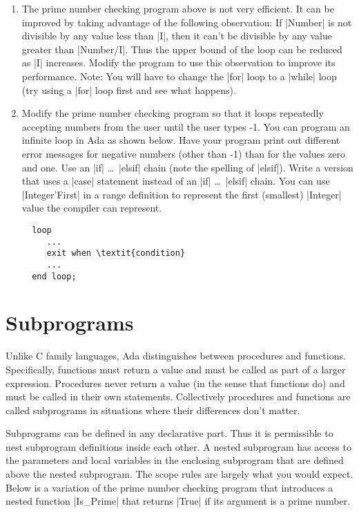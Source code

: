 \begin{enumerate}
\item The prime number checking program above is not very efficient. It can be improved by
  taking advantage of the following observation: If |Number| is not divisible by any value less
  than |I|, then it can't be divisible by any value greater than |Number/I|. Thus the upper
  bound of the loop can be reduced as |I| increases. Modify the program to use this observation
  to improve its performance. Note: You will have to change the |for| loop to a |while| loop
  (try using a |for| loop first and see what happens).

\item Modify the prime number checking program so that it loops repeatedly accepting numbers
  from the user until the user types -1. You can program an infinite loop in Ada as shown below.
  Have your program print out different error messages for negative numbers (other than -1) than
  for the values zero and one. Use an |if| \ldots\ |elsif| chain (note the spelling of |elsif|).
  Write a version that uses a |case| statement instead of an |if| \ldots\ |elsif| chain. You can
  use |Integer'First| in a range definition to represent the first (smallest) |Integer| value
  the compiler can represent.

  \begin{lstlisting}
  loop
     ...
     exit when \textit{condition}
     ...
  end loop;
  \end{lstlisting}
\end{enumerate}

\section{Subprograms}

Unlike C family languages, Ada distinguishes between procedures and functions. Specifically,
functions must return a value and must be called as part of a larger expression. Procedures
never return a value (in the sense that functions do) and must be called in their own
statements. Collectively procedures and functions are called subprograms in situations where
their differences don't matter.

Subprograms can be defined in any declarative part. Thus it is permissible to nest subprogram
definitions inside each other. A nested subprogram has access to the parameters and local
variables in the enclosing subprogram that are defined above the nested subprogram. The scope
rules are largely what you would expect. Below is a variation of the prime number checking
program that introduces a nested function |Is_Prime| that returns |True| if its argument is a
prime number.

